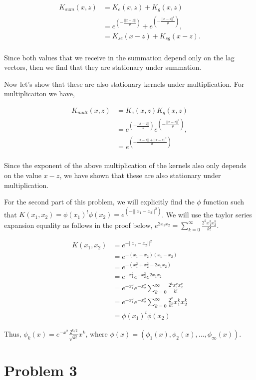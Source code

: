 \documentclass[paper=a4, fontsize=11pt]{scrartcl} %
\begin{document}
\begin{align}
K_{sum}(x,z) &= K_e(x,z)+K_g(x,z) \\
&= e^{(-\frac{||x-z||}{\theta})} + e^{(-\frac{||x-z||^2}{\theta})}, \\
&= K_{se}(x-z) + K_{sg}(x-z). \\
\end{align}

Since both values that we receive in the summation depend only on the lag vectors, then we find that they are stationary under summation.

Now let's show that these are also stationary kernels under multiplication.  For multiplicaiton we have,

\begin{align}
K_{mult}(x,z) &= K_e(x,z)K_g(x,z) \\
&= e^{(-\frac{||x-z||}{\theta})}e^{(-\frac{||x-z||^2}{\theta})}, \\
&=  e^{(-\frac{||x-z||+||x-z||^2}{\theta})}\\
\end{align}

Since the exponent of the above multiplication of the kernels also only depends on the value $x-z$, we have shown that these are also stationary under multiplication.

For the second part of this problem, we will explicitly find the $\phi$ function such that $K(x_1,x_2) = \phi(x_1)^t\phi(x_2) =  e^{(-|||x_1-x_2||^2)}$.  We will use the taylor series expansion equality as follows in the proof below, $e^{2x_1x_2} = \sum \limits_{k=0}^\infty \frac{2^kx_1^kx_2^k}{k!}$. 

\begin{align}
K(x_1,x_2) &= e^{-||x_1-x_2||^2} \\
&= e^{-(x_1-x_2)(x_1-x_2)}\\
&= e^{-(x_1^{2} + x_2^{2} - 2x_1x_2)} \\
&= e^{-x_1^{2}}e^{-x_2^{2}}e^{2x_1x_2} \\
&= e^{-x_1^{2}}e^{-x_2^{2}} \sum \limits_{k=0}^\infty \frac{2^kx_1^kx_2^k}{k!} \\
&= e^{-x_1^{2}}e^{-x_2^{2}}\sum \limits_{k=0}^\infty \frac{2^{k}}{k!}x_1^kx_2^k \\
&= \phi(x_1)^t\phi(x_2)
\end{align}

Thus, $\phi_k(x) = e^{-x^2}\frac{2^{k/2}}{\sqrt{k!}}x^k$, where $\phi(x) = (\phi_1(x),\phi_2(x),...,\phi_\infty(x))$.

\section{Problem 3}
\end{document}
